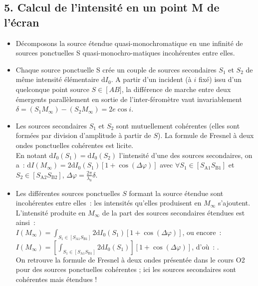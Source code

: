 \documentclass{article}
\newcommand{\mathcolorbox}[2]{\fcolorbox{black}{#1}{$#2$}}
\begin{document}
\subsection*{5. Calcul de l'intensité en un point M de l'écran}
\begin{itemize}
\item Décomposons la source étendue quasi-monochromatique en une
infinité de sources ponctuelles S quasi-monochro-matiques
incohérentes entre elles.
\item Chaque source ponctuelle S crée un
couple de sources secondaires $S_{1}$ et $S_{2}$ de même intensité
élémentaire $\mathrm{d}I_{0}$. A partir d'un incident (à $i$ fixé) issu d'un
quelconque point source $S \in \left[AB]$, la différence de marche entre
deux émergents parallèlement en sortie de l'inter-féromètre vaut
invariablement $\delta = \left(S_{1}M_{\mathrm{\infty}}\right)-\left(S_{2}M_{\mathrm{\infty}}\right) =
2e\cos i$.
\item Les sources secondaires $S_{1}$ et $S_{2}$ sont
mutuellement cohérentes (elles sont formées par division d'amplitude
à partir de $S$). La formule de Fresnel à deux ondes ponctuelles
cohérentes est licite. \\
En notant $\mathrm{d}I_{0}\left(S_{1}\right) =\mathrm{d}I_{0}\left(S_{2}\right)$ l'intensité d'une des
sources secondaires, on a : $\mathrm{d}I\left(M_{\mathrm{\infty}}\right) =
2\mathrm{d}I_{0}\left(S_{1}\right)\left[1+\cos\left(\Delta \varphi\right)\right]$ avec $\forall S_{1}\in
\left[S_{\mathrm{A1}}S_{\mathrm{B1}}\right]$ et $S_{2}  \in \left[S_{\mathrm{A2}}S_{\mathrm{B2}}\right]$, $\Delta \varphi =
\frac{2\pi}{\lambda_{0}}\delta$.
\item Les différentes sources
ponctuelles $S$ formant la source étendue sont incohérentes entre
elles : les intensités qu'elles produisent en $M_{\mathrm{\infty}}$
s'ajoutent. \\
L'intensité produite en $M_{\mathrm{\infty}}$ de la part des sources
secondaires étendues est ainsi : \\
$I\left(M_{\mathrm{\infty}}\right) = \int_{S_{1} \in \left[S_{\mathrm{A1}}S_{\mathrm{B1}}\right]}
2\mathrm{d}I_{0}\left(S_{1}\right)\left[1+\cos\left(\Delta \varphi\right)\right]$, ou encore : $I\left(M_{\mathrm{\infty}}\right)
= \left[\int_{S_{1} \in \left[S_{\mathrm{A1}}S_{\mathrm{B1}}\right]} 2\mathrm{d}I_{0}\left(S_{1}\right)\right]\left[1+\cos\left(\Delta
\varphi\right)\right]$, d'où : \mathcolorbox{gray!20}{I\left(M_{\mathrm{\infty}}\right) = 2I_{0}\left[1+\cos\left(\Delta
\varphi\right)\right]}. \\
On retrouve la formule de Fresnel à deux ondes présentée dans le
cours O2 pour des sources ponctuelles cohérentes ; ici les sources
secondaires sont cohérentes mais étendues !
\end{itemize}
\end{document}
